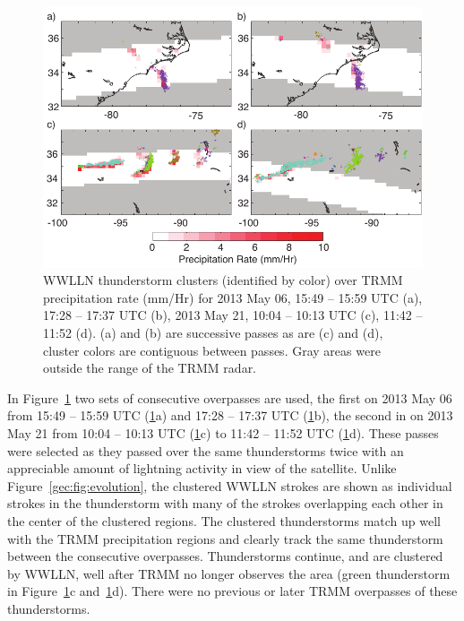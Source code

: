  \begin{figure}[ht!]
    \centering
    \includegraphics[scale=1]{GEC/Figures/overpass.pdf} 
    \caption{WWLLN thunderstorm clusters (identified by color) over TRMM precipitation rate (mm/Hr) for 2013 May 06, 15:49 -- 15:59 UTC (a), 17:28 -- 17:37 UTC (b), 2013 May 21, 10:04 -- 10:13 UTC (c), 11:42 -- 11:52 (d).
    		(a) and (b) are successive passes as are (c) and (d), cluster colors are contiguous between passes.
		Gray areas were outside the range of the TRMM radar.}
    \label{gec:fig:overpass}
 \end{figure}

In Figure~\ref{gec:fig:overpass} two sets of consecutive overpasses are used, the first on 2013 May 06 from 15:49 -- 15:59 UTC (\ref{gec:fig:overpass}a) and 17:28 -- 17:37 UTC (\ref{gec:fig:overpass}b), the second in on 2013 May 21 from 10:04 -- 10:13 UTC (\ref{gec:fig:overpass}c) to 11:42 -- 11:52 UTC (\ref{gec:fig:overpass}d).
These passes were selected as they passed over the same thunderstorms twice with an appreciable amount of lightning activity in view of the satellite.
Unlike Figure~\ref{gec:fig:evolution}, the clustered WWLLN strokes are shown as individual strokes in the thunderstorm with many of the strokes overlapping each other in the center of the clustered regions.
The clustered thunderstorms match up well with the TRMM precipitation regions and clearly track the same thunderstorm between the consecutive overpasses.
Thunderstorms continue, and are clustered by WWLLN, well after TRMM no longer observes the area (green thunderstorm in Figure~\ref{gec:fig:overpass}c and~\ref{gec:fig:overpass}d).
There were no previous or later TRMM overpasses of these thunderstorms.

